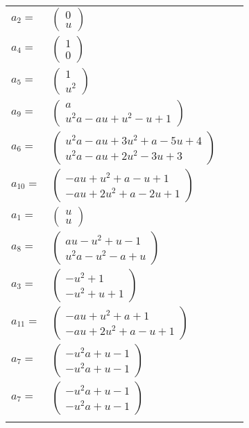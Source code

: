 \documentclass[1p]{elsarticle_modified}
\theoremstyle{definition}
\begin{document}
\begin{tabular}{m{7pt} m{180pt} m{7pt} m{180pt} }
\flushright $a_{2}=$&$\begin{pmatrix}0\\u\end{pmatrix}$ \\
\flushright $a_{4}=$&$\begin{pmatrix}1\\0\end{pmatrix}$ \\
\flushright $a_{5}=$&$\begin{pmatrix}1\\u^2\end{pmatrix}$ \\
\flushright $a_{9}=$&$\begin{pmatrix}a\\u^2 a- a u+u^2- u+1\end{pmatrix}$ \\
\flushright $a_{6}=$&$\begin{pmatrix}u^2 a- a u+3 u^2+a-5 u+4\\u^2 a- a u+2 u^2-3 u+3\end{pmatrix}$ \\
\flushright $a_{10}=$&$\begin{pmatrix}- a u+u^2+a- u+1\\- a u+2 u^2+a-2 u+1\end{pmatrix}$ \\
\flushright $a_{1}=$&$\begin{pmatrix}u\\u\end{pmatrix}$ \\
\flushright $a_{8}=$&$\begin{pmatrix}a u- u^2+u-1\\u^2 a- u^2- a+u\end{pmatrix}$ \\
\flushright $a_{3}=$&$\begin{pmatrix}- u^2+1\\- u^2+u+1\end{pmatrix}$ \\
\flushright $a_{11}=$&$\begin{pmatrix}- a u+u^2+a+1\\- a u+2 u^2+a- u+1\end{pmatrix}$ \\
\flushright $a_{7}=$&$\begin{pmatrix}- u^2 a+u-1\\- u^2 a+u-1\end{pmatrix}$\\ \flushright $a_{7}=$&$\begin{pmatrix}- u^2 a+u-1\\- u^2 a+u-1\end{pmatrix}$\\&\end{tabular}
\end{document}
